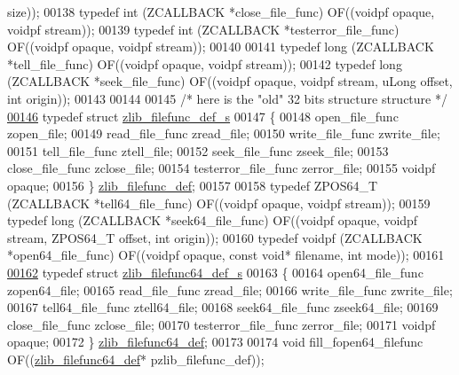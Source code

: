 \begin{DoxyCode}
      size));
00138 \textcolor{keyword}{typedef} int      (ZCALLBACK *close\_file\_func)     OF((voidpf opaque, voidpf stream));
00139 \textcolor{keyword}{typedef} int      (ZCALLBACK *testerror\_file\_func) OF((voidpf opaque, voidpf stream));
00140 
00141 \textcolor{keyword}{typedef} long     (ZCALLBACK *tell\_file\_func)      OF((voidpf opaque, voidpf stream));
00142 \textcolor{keyword}{typedef} long     (ZCALLBACK *seek\_file\_func)      OF((voidpf opaque, voidpf stream, uLong offset, \textcolor{keywordtype}{int} 
      origin));
00143 
00144 
00145 \textcolor{comment}{/* here is the "old" 32 bits structure structure */}
\hyperlink{structzlib__filefunc__def__s}{00146} \textcolor{keyword}{typedef} \textcolor{keyword}{struct }\hyperlink{structzlib__filefunc__def__s}{zlib\_filefunc\_def\_s}
00147 \{
00148     open\_file\_func      zopen\_file;
00149     read\_file\_func      zread\_file;
00150     write\_file\_func     zwrite\_file;
00151     tell\_file\_func      ztell\_file;
00152     seek\_file\_func      zseek\_file;
00153     close\_file\_func     zclose\_file;
00154     testerror\_file\_func zerror\_file;
00155     voidpf              opaque;
00156 \} \hyperlink{structzlib__filefunc__def__s}{zlib\_filefunc\_def};
00157 
00158 \textcolor{keyword}{typedef} ZPOS64\_T (ZCALLBACK *tell64\_file\_func)    OF((voidpf opaque, voidpf stream));
00159 \textcolor{keyword}{typedef} long     (ZCALLBACK *seek64\_file\_func)    OF((voidpf opaque, voidpf stream, ZPOS64\_T offset, \textcolor{keywordtype}{int} 
      origin));
00160 \textcolor{keyword}{typedef} voidpf   (ZCALLBACK *open64\_file\_func)    OF((voidpf opaque, \textcolor{keyword}{const} \textcolor{keywordtype}{void}* filename, \textcolor{keywordtype}{int} mode));
00161 
\hyperlink{structzlib__filefunc64__def__s}{00162} \textcolor{keyword}{typedef} \textcolor{keyword}{struct }\hyperlink{structzlib__filefunc64__def__s}{zlib\_filefunc64\_def\_s}
00163 \{
00164     open64\_file\_func    zopen64\_file;
00165     read\_file\_func      zread\_file;
00166     write\_file\_func     zwrite\_file;
00167     tell64\_file\_func    ztell64\_file;
00168     seek64\_file\_func    zseek64\_file;
00169     close\_file\_func     zclose\_file;
00170     testerror\_file\_func zerror\_file;
00171     voidpf              opaque;
00172 \} \hyperlink{structzlib__filefunc64__def__s}{zlib\_filefunc64\_def};
00173 
00174 \textcolor{keywordtype}{void} fill\_fopen64\_filefunc OF((\hyperlink{structzlib__filefunc64__def__s}{zlib\_filefunc64\_def}* pzlib\_filefunc\_def));

\end{DoxyCode}
